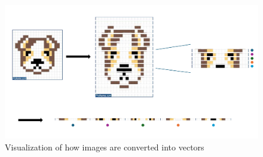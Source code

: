 \begin{figure}[H]
    \centering
    \includegraphics[width=1\linewidth]{dl/img-vector.png}
    \caption{Visualization of how images are converted into vectors}
    \label{fig:img-vector}
\end{figure}

